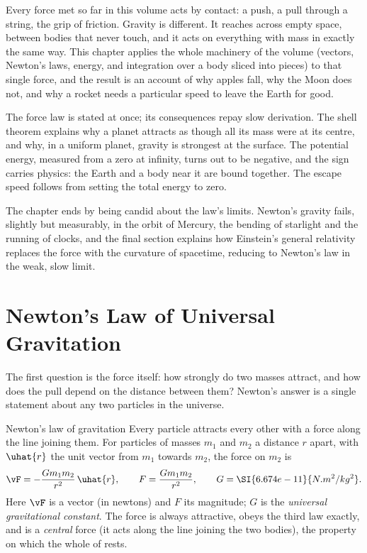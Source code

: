 
\label{ch:gravitation}

Every force met so far in this volume acts by contact: a push, a pull through a string, the grip of
friction. Gravity is different. It reaches across empty space, between bodies that never touch, and it
acts on everything with mass in exactly the same way. This chapter applies the whole machinery of the
volume (vectors, Newton's laws, energy, and integration over a body sliced into pieces) to that single
force, and the result is an account of why apples fall, why the Moon does not, and why a rocket needs a
particular speed to leave the Earth for good.

The force law is stated at once; its consequences repay slow derivation. The shell theorem explains why a
planet attracts as though all its mass were at its centre, and why, in a uniform planet, gravity is
strongest at the surface. The potential energy, measured from a zero at infinity, turns out to be
negative, and the sign carries physics: the Earth and a body near it are bound together. The escape speed
follows from setting the total energy to zero.

The chapter ends by being candid about the law's limits. Newton's gravity fails, slightly but measurably,
in the orbit of Mercury, the bending of starlight and the running of clocks, and the final section
explains how Einstein's general relativity replaces the force with the curvature of spacetime, reducing
to Newton's law in the weak, slow limit.

\section{Newton's Law of Universal Gravitation}\label{sec:newtonlaw}

The first question is the force itself: how strongly do two masses attract, and how does the pull
depend on the distance between them? Newton's answer is a single statement about any two particles in
the universe.

\begin{keybox}{Newton's law of gravitation}
Every particle attracts every other with a force along the line joining them. For particles of masses
$m_1$ and $m_2$ a distance $r$ apart, with $\uhat{r}$ the unit vector from $m_1$ towards $m_2$, the force
on $m_2$ is
\[
\vF=-\frac{Gm_1m_2}{r^2}\,\uhat{r},\qquad F=\frac{Gm_1m_2}{r^2},\qquad G=\SI{6.674e-11}{N.m^2/kg^2}.
\]
Here $\vF$ is a vector (in newtons) and $F$ its magnitude; $G$ is the \emph{universal gravitational
constant}. The force is always attractive, obeys the third law exactly, and is a \emph{central} force
(it acts along the line joining the two bodies), the property on which the whole of  rests.
\end{keybox}

